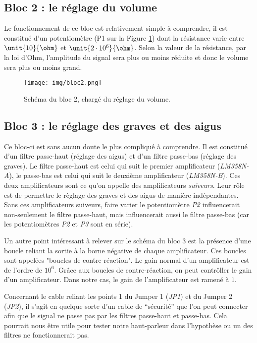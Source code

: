 \subsection{Bloc 2 : le réglage du volume}

Le fonctionnement de ce bloc est relativement simple à comprendre, il est constitué d'un potentiomètre (P1 sur la Figure \ref{bloc2}) dont la résistance varie entre $\unit{10}{\ohm}$ et $\unit{2 \cdot 10^{6}}{\ohm}$. Selon la valeur de la résistance, par la loi d'Ohm, l'amplitude du signal sera plus ou moins réduite et donc le volume sera plus ou moins grand.

\begin{figure}[h]
	\centering
	\texttt{[image: img/bloc2.png]}
	\caption{Schéma du bloc 2, chargé du réglage du volume.}
	\label{bloc2}
\end{figure}

\subsection{Bloc 3 : le réglage des graves et des aigus}

Ce bloc-ci est sans aucun doute le plus compliqué à comprendre. Il est constitué d'un filtre passe-haut (réglage des aigus) et d'un filtre passe-bas (réglage des graves). Le filtre passe-haut est celui qui suit le premier amplificateur (\textit{LM358N-A}), le passe-bas est celui qui suit le deuxième amplificateur (\textit{LM358N-B}). Ces deux amplificateurs sont ce qu'on appelle des amplificateurs \textit{suiveurs}. Leur rôle est de permettre le règlage des graves et des aigus de manière indépendantes. Sans ces amplificateurs suiveurs, faire varier le potentiomètre \textit{P2} influencerait non-seulement le filtre passe-haut, mais influencerait aussi le filtre passe-bas (car les potentiomètres \textit{P2} et \textit{P3} sont en série).

Un autre point intéressant à relever sur le schéma du bloc 3 est la présence d'une boucle reliant la sortie à la borne négative de chaque amplificateur. Ces boucles sont appelées "boucles de contre-réaction". Le gain normal d'un amplificateur est de l'ordre de $10^{6}$. Grâce aux boucles de contre-réaction, on peut contrôller le gain d'un amplificateur. Dans notre cas, le gain de l'amplificateur est ramené à $1$.

Concernant le cable reliant les points 1 du Jumper 1 (\textit{JP1}) et du Jumper 2 (\textit{JP2}), il s'agit en quelque sorte d'un cable de "`sécurité"' que l'on peut connecter afin que le signal ne passe pas par les filtres passe-haut et passe-bas. Cela pourrait nous être utile pour tester notre haut-parleur dans l'hypothèse ou un des filtres ne fonctionnerait pas.

